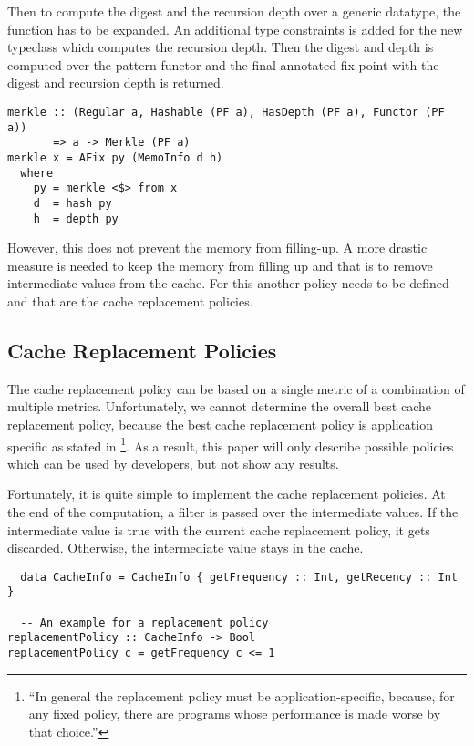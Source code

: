 Then to compute the digest and the recursion depth over a generic datatype, the  function has to be expanded. An additional type constraints  is added for the new typeclass which computes the recursion depth. Then the digest and depth is computed over the pattern functor and the final annotated fix-point with the digest and recursion depth is returned.

\begin{verbatim}
merkle :: (Regular a, Hashable (PF a), HasDepth (PF a), Functor (PF a)) 
       => a -> Merkle (PF a)
merkle x = AFix py (MemoInfo d h)
  where
    py = merkle <$> from x
    d  = hash py
    h  = depth py
\end{verbatim}


However, this does not prevent the memory from filling-up. A more drastic measure is needed to keep the memory from filling up and that is to remove intermediate values from the cache. For this another policy needs to be defined and that are the cache replacement policies.

\subsection{Cache Replacement Policies}

The cache replacement policy can be based on a single metric of a combination of multiple metrics. Unfortunately, we cannot determine the overall best cache replacement policy, because the best cache replacement policy is application specific as stated in \footnote{``In general the replacement policy must be application-specific, because, for any fixed policy, there are programs whose performance is made worse by that choice.''\cite{acar2003selective}}. As a result, this paper will only describe possible policies which can be used by developers, but not show any results.

Fortunately, it is quite simple to implement the cache replacement policies. At the end of the  computation, a filter is passed over the intermediate values. If the intermediate value is true with the current cache replacement policy, it gets discarded. Otherwise, the intermediate value stays in the cache. 


\begin{verbatim}
  data CacheInfo = CacheInfo { getFrequency :: Int, getRecency :: Int }
  
  -- An example for a replacement policy
replacementPolicy :: CacheInfo -> Bool
replacementPolicy c = getFrequency c <= 1
\end{verbatim}


